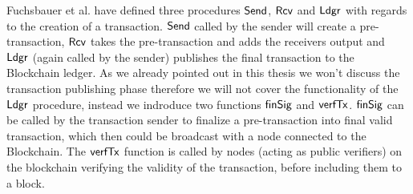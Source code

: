 Fuchsbauer et al. have defined three procedures $\mathsf{Send}$, $\mathsf{Rcv}$ and $\mathsf{Ldgr}$ with regards to the creation of a transaction. $\mathsf{Send}$ called by the sender
will create a pre-transaction, $\mathsf{Rcv}$ takes the pre-transaction and adds the receivers output and $\mathsf{Ldgr}$ (again called by the sender) publishes the final transaction to the Blockchain ledger.
As we already pointed out in this thesis we won't discuss the transaction publishing phase therefore we will not cover the functionality of the $\mathsf{Ldgr}$ procedure, instead we indroduce two
functions $\mathsf{finSig}$ and $\mathsf{verfTx}$. $\mathsf{finSig}$ can be called by the transaction sender to finalize a pre-transaction into final valid transaction, which then could be broadcast with a node
connected to the Blockchain. The $\mathsf{verfTx}$ function is called by nodes (acting as public verifiers) on the blockchain verifying the validity of the transaction, before including them to a block.

